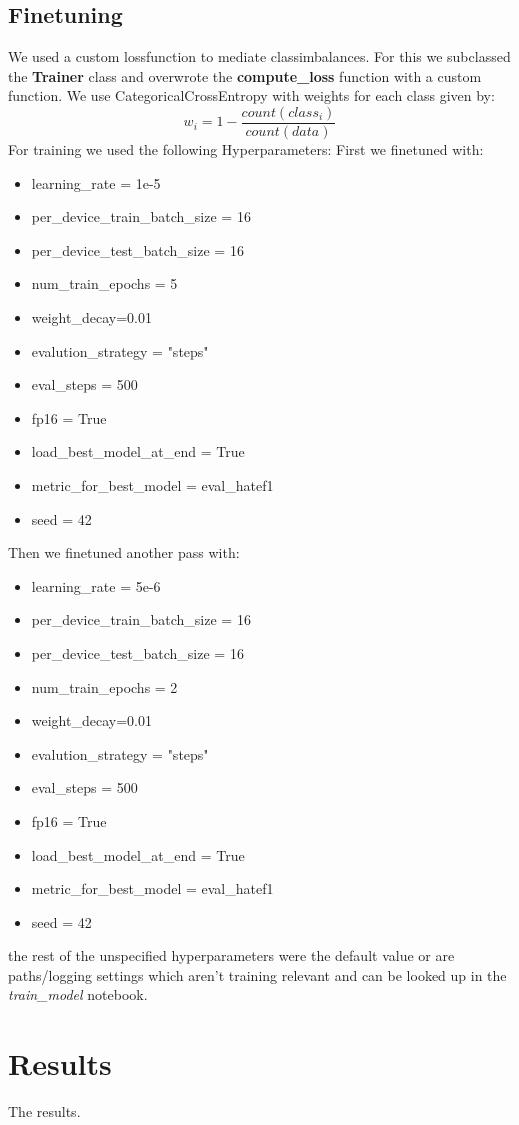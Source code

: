 \documentclass[11pt,a4paper]{article}
\begin{document}
\subsection{Finetuning}
We used a custom lossfunction to mediate classimbalances.
For this we subclassed the \textbf{Trainer} class and overwrote the \textbf{compute\_loss} function with a custom function.
We use CategoricalCrossEntropy with weights for each class given by:
$$ w_i = 1 - \frac{count(class_i)}{count(data)}$$
For training we used the following Hyperparameters:
First we finetuned with: 
\begin{itemize}
    \item learning\_rate = 1e-5
    \item per\_device\_train\_batch\_size = 16
    \item per\_device\_test\_batch\_size = 16
    \item num\_train\_epochs = 5
    \item weight\_decay=0.01
    \item evalution\_strategy = "steps"
    \item eval\_steps = 500
    \item fp16 = True
    \item load\_best\_model\_at\_end = True
    \item metric\_for\_best\_model = eval\_hatef1
    \item seed = 42
\end{itemize}
Then we finetuned another pass with:
\begin{itemize}
    \item learning\_rate = 5e-6
    \item per\_device\_train\_batch\_size = 16
    \item per\_device\_test\_batch\_size = 16
    \item num\_train\_epochs = 2
    \item weight\_decay=0.01
    \item evalution\_strategy = "steps"
    \item eval\_steps = 500
    \item fp16 = True
    \item load\_best\_model\_at\_end = True
    \item metric\_for\_best\_model = eval\_hatef1
    \item seed = 42
\end{itemize}
the rest of the unspecified hyperparameters were the default value or are paths/logging settings which aren't training
relevant and can be looked up in the \textit{train\_model} notebook.

\section{Results}
The results.




\end{document}
